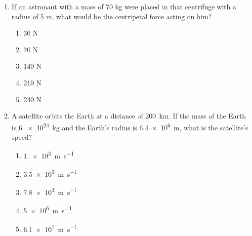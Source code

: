 \documentclass{../../../oss-apphys}
\begin{document}
\begin{multicols}{2}
\begin{enumerate}[leftmargin=18pt,resume]
  \item If an astronaut with a mass of 70 kg were placed in that centrifuge with
    a radius of 5 m, what would be the centripetal force acting on him?
    \label{centrifugal2}
    \begin{enumerate}[nosep,leftmargin=18pt,label=(\Alph*)]
    \item 30 N
    \item 70 N
    \item 140 N
    \item 210 N
    \item 240 N
    \end{enumerate}
    
    
    
  \item A satellite orbits the Earth at a distance of \SI{200}{\kilo\metre}. If
    the mass of the Earth is \SI{6.e24}{\kilo\gram} and the Earth's radius is
    \SI{6.4e6}{\metre}, what is the satellite's speed?
    \begin{enumerate}[nosep,leftmargin=18pt,label=(\Alph*)]
    \item\SI{1.e3}{\metre\per\second}
    \item\SI{3.5e3}{\metre\per\second}
    \item\SI{7.8e3}{\metre\per\second}
    \item\SI{5e6}{\metre\per\second}
    \item\SI{6.1e7}{\metre\per\second}
    \end{enumerate}
    \columnbreak
    

\end{enumerate}
\end{multicols}
\end{document}
